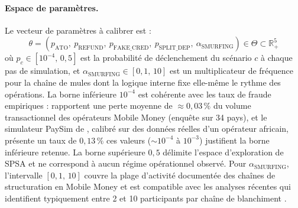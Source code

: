 \documentclass[11pt,a4paper,oneside]{report}
\theoremstyle{definition}
\theoremstyle{remark}
\begin{document}
\paragraph{Espace de paramètres.}
Le vecteur de paramètres à calibrer est :
\begin{equation}
    \theta = \left(p_\text{ATO},\ p_\text{REFUND},\ p_\text{FAKE\_CRED},\ p_\text{SPLIT\_DEP},\ \alpha_\text{SMURFING}\right) \in \Theta \subset \mathbb{R}^5_+
\end{equation}
où $p_c \in [10^{-4},\, 0{,}5]$ est la probabilité de déclenchement du scénario $c$ à chaque pas de simulation, et $\alpha_\text{SMURFING} \in [0{,}1,\, 10]$ est un multiplicateur de fréquence pour la chaîne de mules dont la logique interne fixe elle-même le rythme des opérations. La borne inférieure $10^{-4}$ est cohérente avec les taux de fraude empiriques : \citet{gsma2024fraud} rapportent une perte moyenne de $\approx 0{,}03\,\%$ du volume transactionnel des opérateurs Mobile Money (enquête sur 34 pays), et le simulateur PaySim de \citet{lopezrojas2016paysim}, calibré sur des données réelles d'un opérateur africain, présente un taux de $0{,}13\,\%$  ces valeurs ($\sim 10^{-4}$ à $10^{-3}$) justifient la borne inférieure retenue. La borne supérieure $0{,}5$ délimite l'espace d'exploration de SPSA et ne correspond à aucun régime opérationnel observé. Pour $\alpha_\text{SMURFING}$, l'intervalle $[0{,}1,\, 10]$ couvre la plage d'activité documentée des chaînes de structuration en Mobile Money \citep{zhdanova2014smurfs} et est compatible avec les analyses récentes qui identifient typiquement entre 2 et 10 participants par chaîne de blanchiment \citep{deprez2025gargaml}.
\end{document}
